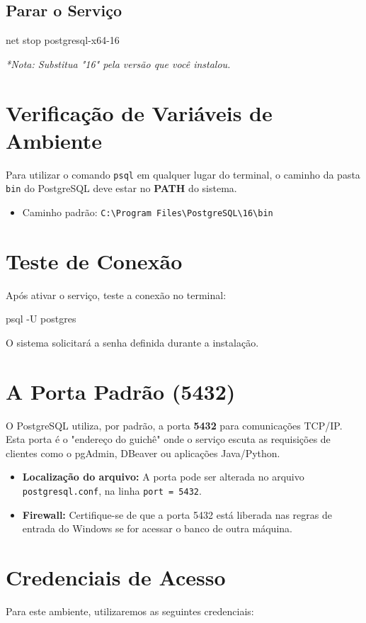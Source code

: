 \subsection{Parar o Serviço}
\begin{sqlcode}
net stop postgresql-x64-16
\end{sqlcode}
\textit{*Nota: Substitua "16" pela versão que você instalou.}

\section{Verificação de Variáveis de Ambiente}
Para utilizar o comando \texttt{psql} em qualquer lugar do terminal, o caminho da pasta \texttt{bin} do PostgreSQL deve estar no \textbf{PATH} do sistema.

\begin{itemize}
    \item Caminho padrão: \texttt{C:\textbackslash Program Files\textbackslash PostgreSQL\textbackslash 16\textbackslash bin}
\end{itemize}

\section{Teste de Conexão}
Após ativar o serviço, teste a conexão no terminal:
\begin{sqlcode}
psql -U postgres
\end{sqlcode}
O sistema solicitará a senha definida durante a instalação.

\section{A Porta Padrão (5432)}
O PostgreSQL utiliza, por padrão, a porta \textbf{5432} para comunicações TCP/IP. 
Esta porta é o "endereço do guichê" onde o serviço escuta as requisições de clientes como o pgAdmin, DBeaver ou aplicações Java/Python.

\begin{itemize}
    \item \textbf{Localização do arquivo:} A porta pode ser alterada no arquivo \texttt{postgresql.conf}, na linha \texttt{port = 5432}.
    \item \textbf{Firewall:} Certifique-se de que a porta 5432 está liberada nas regras de entrada do Windows se for acessar o banco de outra máquina.
\end{itemize}

\section{Credenciais de Acesso}
Para este ambiente, utilizaremos as seguintes credenciais:


